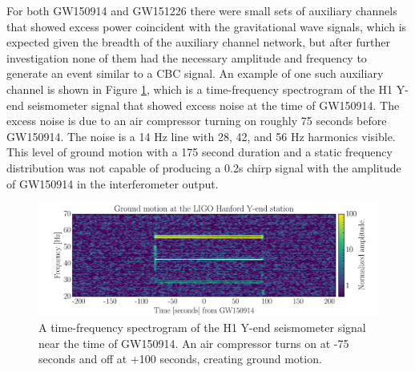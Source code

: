 For both GW150914 and GW151226 there were small sets of auxiliary channels 
that showed excess power coincident with the 
gravitational wave signals, which is expected given the breadth of the auxiliary 
channel network, but after further investigation none of them had the 
necessary amplitude and frequency to generate an event similar to a CBC 
signal. An example of one such auxiliary channel is shown in Figure \ref{fig:compressor}, 
which 
is a time-frequency spectrogram of the H1 Y-end seismometer signal that showed 
excess noise at the time of GW150914. The excess 
noise is due to an air compressor turning on roughly 75 seconds before GW150914. 
The noise is a 14 Hz line with 28, 42, and 56 Hz harmonics visible. This level of 
ground motion with a 175 second duration and a static frequency distribution was 
not capable of producing a 0.2s chirp signal with the amplitude of GW150914 in 
the interferometer output.

\begin{figure}
\includegraphics[width=\textwidth]{figures/detchar/H1_AIR_COMPRESSOR_GW150914}
\caption[H1 Y-end air compressor]{A time-frequency spectrogram of the H1 %
         Y-end seismometer signal near the time of GW150914. An air compressor %
         turns on at -75 seconds and off at +100 seconds, creating ground motion.}
\label{fig:compressor}
\end{figure}
